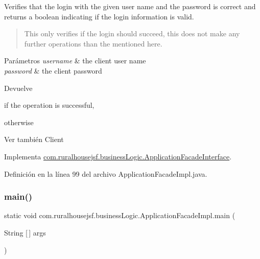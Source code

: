 Verifies that the login with the given user name and the password is correct and returns a boolean indicating if the login information is valid. 

\begin{quote}
This only verifies if the login should succeed, this does not make any further operations than the mentioned here. \end{quote}



\begin{DoxyParams}{Parámetros}
{\em username} & the client user name \\
\hline
{\em password} & the client password\\
\hline
\end{DoxyParams}
\begin{DoxyReturn}{Devuelve}

\begin{DoxyCode}{0}
\DoxyCodeLine{\textcolor{keyword}{true} }
\end{DoxyCode}
 if the operation is successful,
\begin{DoxyCode}{0}
\DoxyCodeLine{\textcolor{keyword}{false} }
\end{DoxyCode}
 otherwise
\end{DoxyReturn}
\begin{DoxySeeAlso}{Ver también}
Client 
\end{DoxySeeAlso}


Implementa \mbox{\hyperlink{interfacecom_1_1ruralhousejsf_1_1business_logic_1_1_application_facade_interface_a75cc2d20f7df7b8872333cca281bf343}{com.\+ruralhousejsf.\+business\+Logic.\+Application\+Facade\+Interface}}.



Definición en la línea 99 del archivo Application\+Facade\+Impl.\+java.

\mbox{\label{classcom_1_1ruralhousejsf_1_1business_logic_1_1_application_facade_impl_a19d9b0706fe39437efc379c3bc747e06}} 
\subsubsection{\texorpdfstring{main()}{main()}}
{\footnotesize\ttfamily static void com.\+ruralhousejsf.\+business\+Logic.\+Application\+Facade\+Impl.\+main (\begin{DoxyParamCaption}\item[{String \mbox{[}$\,$\mbox{]}}]{args }\end{DoxyParamCaption})\hspace{0.3cm}{\ttfamily [static]}}



